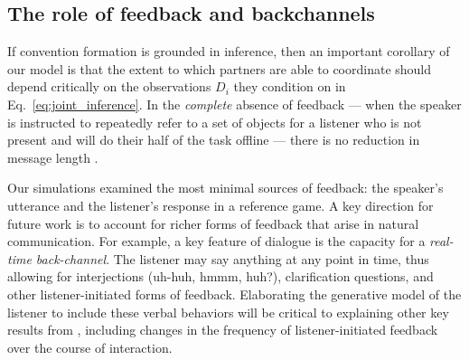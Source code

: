 \subsection{The role of feedback and backchannels}

If convention formation is grounded in inference, then an important corollary of our model is that the extent to which partners are able to coordinate should depend critically on the observations $D_i$ they condition on in Eq.~\ref{eq:joint_inference}.
In the \emph{complete} absence of feedback --- when the speaker is instructed to repeatedly refer to a set of objects for a listener who is not present and will do their half of the task offline --- there is no reduction in message length . 

Our simulations examined the most minimal sources of feedback: the speaker's utterance and the listener's response in a reference game.
A key direction for future work is to account for richer forms of feedback that arise in natural communication.
For example, a key feature of dialogue is the capacity for a \emph{real-time back-channel}.
The listener may say anything at any point in time, thus allowing for interjections (uh-huh, hmmm, huh?), clarification questions, and other listener-initiated forms of feedback. 
Elaborating the generative model of the listener to include these verbal behaviors will be critical to explaining other key results from , including changes in the frequency of listener-initiated feedback over the course of interaction.

